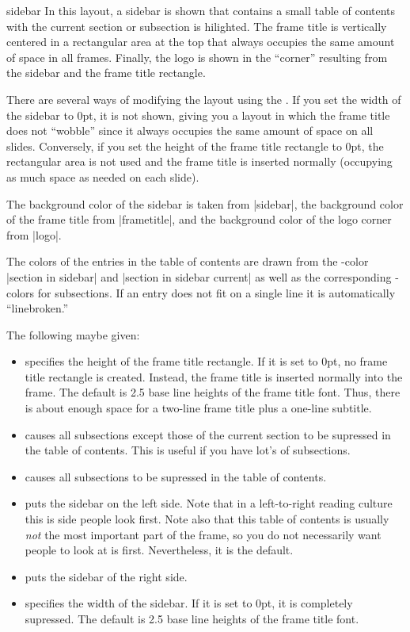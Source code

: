 \begin{outerthemeexample}{sidebar}
  In this layout, a sidebar is shown that contains a small table of
  contents with the current section or subsection is hilighted. The
  frame title is vertically centered in a rectangular area at the top
  that always occupies the same amount of space in all
  frames. Finally, the logo is shown in the ``corner'' resulting from
  the sidebar and the frame title rectangle.

  There are several ways of modifying the layout using the
  . If you set the width of the sidebar to 0pt, it is
  not shown, giving you a layout in which the frame title does not
  ``wobble'' since it always occupies the same amount of space on all
  slides. Conversely, if you set the height of the frame title
  rectangle to 0pt, the rectangular area is not used and the frame
  title is inserted normally (occupying as much space as needed on
  each slide).

  The background color of the sidebar is taken from |sidebar|, the
  background color of the frame title from |frametitle|, and the
  background color of the logo corner from |logo|.

  The colors of the entries in the table of contents are drawn from
  the \beamer-color |section in sidebar| and |section in sidebar current| as well as the
  corresponding \beamer-colors for subsections. If an entry does not
  fit on a single line it is automatically ``linebroken.'' 

  The following  maybe given:
  \begin{itemize}
  \item
     specifies the height of the
    frame title rectangle. If it is set to 0pt, no frame title
    rectangle is created. Instead, the frame title is inserted
    normally into the frame. The default is 2.5 base line heights of
    the frame title font. Thus, there is about enough space for a
    two-line frame title plus a one-line subtitle.
  \item
     causes all subsections except
    those of the current section to be supressed in the table of
    contents. This is useful if you have lot's of subsections.
  \item
     causes all subsections to be
    supressed in the table of contents.
  \item
     puts the sidebar on the left side. Note that in a
    left-to-right reading culture this is side people look first. Note
    also that this table of contents is usually \emph{not} the most
    important part of the frame, so you do not necessarily want people
    to look at is first. Nevertheless, it is the default.
  \item
     puts the sidebar of the right side.
  \item
     specifies the width of the
    sidebar. If it is set to 0pt, it is completely supressed. The
    default is 2.5 base line heights of the frame title font.
  \end{itemize}
\end{outerthemeexample}

